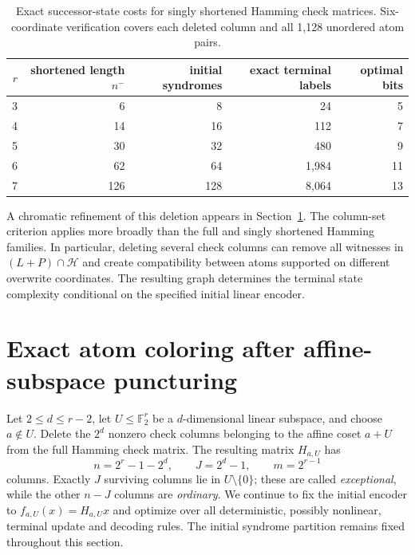 \documentclass[11pt,a4paper]{article}
\begin{document}
\begin{table}[htbp]\centering\small
\begin{tabular}{@{}rrrrr@{}}\toprule
$r$ & shortened length $n^-$ & initial syndromes & exact terminal labels & optimal bits \\\midrule
3&6&8&24&5\\
4&14&16&112&7\\
5&30&32&480&9\\
6&62&64&1,984&11\\
7&126&128&8,064&13\\\bottomrule
\end{tabular}
\caption{Exact successor-state costs for singly shortened Hamming check matrices. Six-coordinate verification covers each deleted column and all 1,128 unordered atom pairs.}\label{tab:shortened}
\end{table}

A chromatic refinement of this deletion appears in Section~\ref{sec:plane-exact}. The column-set criterion applies more broadly than the full and singly shortened Hamming families. In particular, deleting several check columns can remove all witnesses in $(L+P)\cap\mathscr H$ and create compatibility between atoms supported on different overwrite coordinates. The resulting graph determines the terminal state complexity conditional on the specified initial linear encoder.

\section{Exact atom coloring after affine-subspace puncturing}\label{sec:plane-exact}
Let $2\le d\le r-2$, let $U\le\mathbb F_2^r$ be a $d$-dimensional
linear subspace, and choose $a\notin U$. Delete the $2^d$ nonzero check
columns belonging to the affine coset $a+U$ from the full Hamming check
matrix. The resulting matrix $H_{a,U}$ has
\begin{equation}\label{eq:hierarchy-params}
 n=2^r-1-2^d,\qquad J=2^d-1,\qquad m=2^{r-1}
\end{equation}
columns. Exactly $J$ surviving columns lie in $U\setminus\{0\}$;
these are called \emph{exceptional}, while the other $n-J$ columns are
\emph{ordinary}. We continue to fix the initial encoder to
$f_{a,U}(x)=H_{a,U}x$ and optimize over all deterministic, possibly nonlinear,
terminal update and decoding rules. The initial syndrome partition remains fixed throughout this section.
\end{document}

